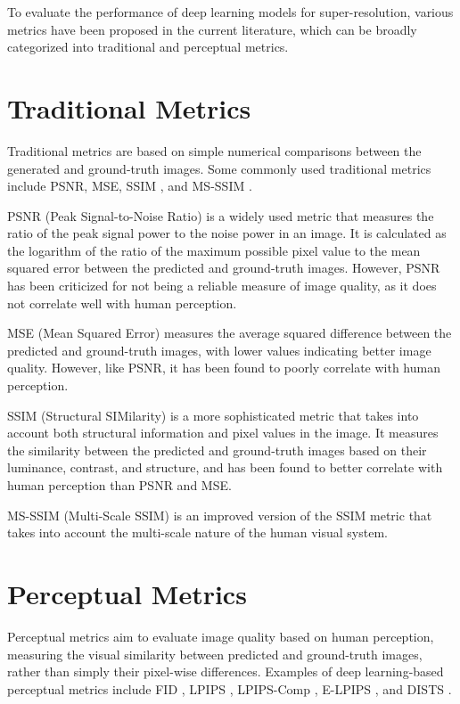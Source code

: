 \label{chap:Metrics}

To evaluate the performance of deep learning models for super-resolution, various metrics have been proposed in the current literature, which can be broadly categorized into traditional and perceptual metrics.

\section{Traditional Metrics}
\label{sec:traditional-metrics}
Traditional metrics are based on simple numerical comparisons between the generated and ground-truth images. Some commonly used traditional metrics include PSNR, MSE, SSIM \cite{wang2004image}, and MS-SSIM \cite{wang2003multiscale}.

PSNR (Peak Signal-to-Noise Ratio) is a widely used metric that measures the ratio of the peak signal power to the noise power in an image. It is calculated as the logarithm of the ratio of the maximum possible pixel value to the mean squared error between the predicted and ground-truth images. However, PSNR has been criticized for not being a reliable measure of image quality, as it does not correlate well with human perception.

MSE (Mean Squared Error) measures the average squared difference between the predicted and ground-truth images, with lower values indicating better image quality. However, like PSNR, it has been found to poorly correlate with human perception.

SSIM (Structural SIMilarity) is a more sophisticated metric that takes into account both structural information and pixel values in the image. It measures the similarity between the predicted and ground-truth images based on their luminance, contrast, and structure, and has been found to better correlate with human perception than PSNR and MSE.

MS-SSIM (Multi-Scale SSIM) is an improved version of the SSIM metric that takes into account the multi-scale nature of the human visual system.

\section{Perceptual Metrics}
\label{sec:perceptual-metrics}
Perceptual metrics aim to evaluate image quality based on human perception, measuring the visual similarity between predicted and ground-truth images, rather than simply their pixel-wise differences. Examples of deep learning-based perceptual metrics include FID \cite{heusel2017gans}, LPIPS \cite{zhang2018unreasonable}, LPIPS-Comp \cite{patel2021saliency}, E-LPIPS \cite{kettunen2019lpips}, and DISTS \cite{ding2020image}.

